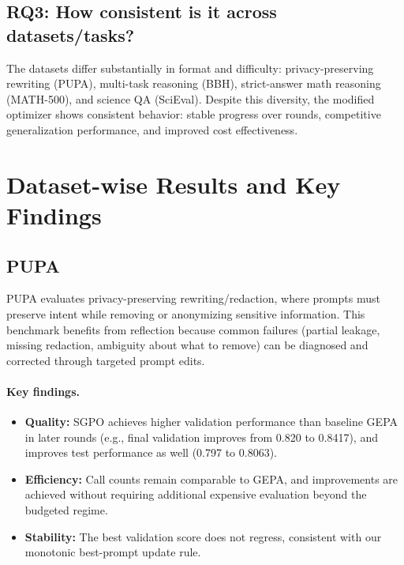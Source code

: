 \subsection*{RQ3: How consistent is it across datasets/tasks?}
The datasets differ substantially in format and difficulty: privacy-preserving rewriting (PUPA), multi-task reasoning (BBH), strict-answer math reasoning (MATH-500), and science QA (SciEval). Despite this diversity, the modified optimizer shows consistent behavior: stable progress over rounds, competitive generalization performance, and improved cost effectiveness.

\section{Dataset-wise Results and Key Findings}

\subsection{PUPA}
PUPA evaluates privacy-preserving rewriting/redaction, where prompts must preserve intent while removing or anonymizing sensitive information. This benchmark benefits from reflection because common failures (partial leakage, missing redaction, ambiguity about what to remove) can be diagnosed and corrected through targeted prompt edits.

\paragraph{Key findings.}
\begin{itemize}
    \item \textbf{Quality:} SGPO achieves higher validation performance than baseline GEPA in later rounds (e.g., final validation improves from 0.820 to 0.8417), and improves test performance as well (0.797 to 0.8063).
    \item \textbf{Efficiency:} Call counts remain comparable to GEPA, and improvements are achieved without requiring additional expensive evaluation beyond the budgeted regime.
    \item \textbf{Stability:} The best validation score does not regress, consistent with our monotonic best-prompt update rule.
\end{itemize}

